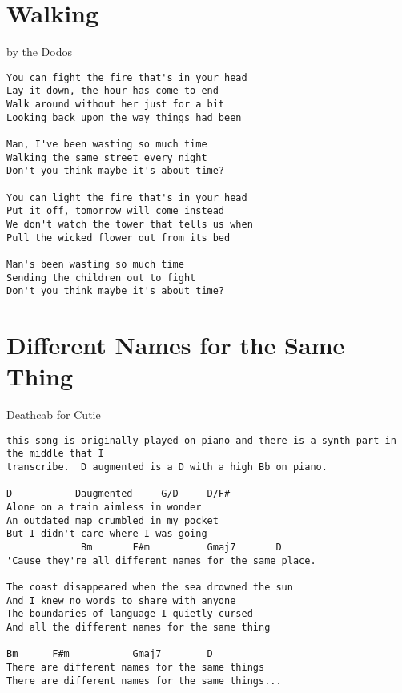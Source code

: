 \documentclass[leqno]{memoir}
\begin{document}
\chapter{Walking}
by the Dodos
\begin{verbatim}
You can fight the fire that's in your head
Lay it down, the hour has come to end
Walk around without her just for a bit
Looking back upon the way things had been

Man, I've been wasting so much time
Walking the same street every night
Don't you think maybe it's about time?

You can light the fire that's in your head
Put it off, tomorrow will come instead
We don't watch the tower that tells us when
Pull the wicked flower out from its bed

Man's been wasting so much time
Sending the children out to fight
Don't you think maybe it's about time? 
\end{verbatim}
\newpage

\chapter{Different Names for the Same Thing}
Deathcab for Cutie
\begin{verbatim}
this song is originally played on piano and there is a synth part in the middle that I 
transcribe.  D augmented is a D with a high Bb on piano.

D           Daugmented     G/D     D/F#
Alone on a train aimless in wonder
An outdated map crumbled in my pocket
But I didn't care where I was going
             Bm       F#m          Gmaj7       D
'Cause they're all different names for the same place.

The coast disappeared when the sea drowned the sun
And I knew no words to share with anyone
The boundaries of language I quietly cursed
And all the different names for the same thing

Bm      F#m           Gmaj7        D
There are different names for the same things
There are different names for the same things...
\end{verbatim}
\newpage
\end{document}
